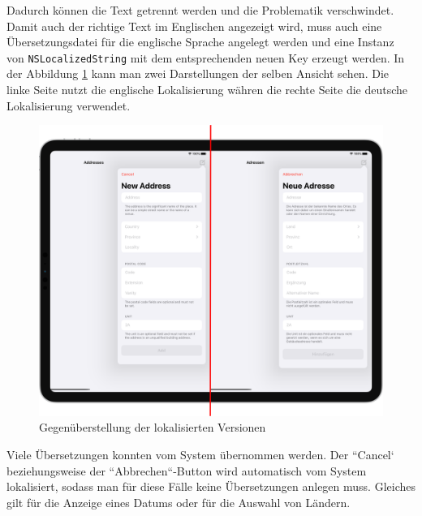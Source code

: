 Dadurch können die Text getrennt werden und die Problematik verschwindet.
Damit auch der richtige Text im Englischen angezeigt wird, muss auch eine Übersetzungsdatei für die englische Sprache angelegt werden und eine Instanz von \texttt{NSLocalizedString} mit dem entsprechenden neuen Key erzeugt werden.\pbreak%
%
In der Abbildung \ref{fig:localized-results} kann man zwei Darstellungen der selben Ansicht sehen.
Die linke Seite nutzt die englische Lokalisierung währen die rechte Seite die deutsche Lokalisierung verwendet.
\begin{figure}[h]
	\centering
	\includegraphics[scale=0.25]{images/localized.png}
	\caption{Gegenüberstellung der lokalisierten Versionen}
	\label{fig:localized-results}
\end{figure}
Viele Übersetzungen konnten vom System übernommen werden.
Der ``Cancel` beziehungsweise der ``Abbrechen``-Button wird automatisch vom System lokalisiert, sodass man für diese Fälle keine Übersetzungen anlegen muss.
Gleiches gilt für die Anzeige eines Datums oder für die Auswahl von Ländern.

